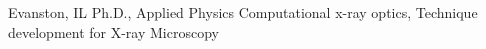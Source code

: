 
        {Evanston, IL}
		{\newline Ph.D., Applied Physics}
		{\newline Computational x-ray optics, Technique development for X-ray Microscopy}
		{}
